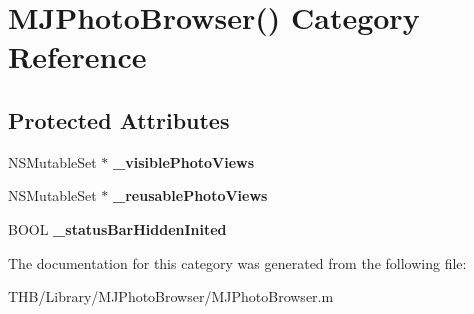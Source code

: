 \hypertarget{category_m_j_photo_browser_07_08}{}\section{M\+J\+Photo\+Browser() Category Reference}
\label{category_m_j_photo_browser_07_08}
\subsection*{Protected Attributes}
\begin{DoxyCompactItemize}
\item 
\mbox{\label{category_m_j_photo_browser_07_08_a8425b142ebed04cab2353333a4bea682}} 
N\+S\+Mutable\+Set $\ast$ {\bfseries \+\_\+visible\+Photo\+Views}
\item 
\mbox{\label{category_m_j_photo_browser_07_08_a3008ca95a1ca4ed5133c5185800deae0}} 
N\+S\+Mutable\+Set $\ast$ {\bfseries \+\_\+reusable\+Photo\+Views}
\item 
\mbox{\label{category_m_j_photo_browser_07_08_a0463ac3319f8b67628866a2a19794668}} 
B\+O\+OL {\bfseries \+\_\+status\+Bar\+Hidden\+Inited}
\end{DoxyCompactItemize}


The documentation for this category was generated from the following file\+:\begin{DoxyCompactItemize}
\item 
T\+H\+B/\+Library/\+M\+J\+Photo\+Browser/M\+J\+Photo\+Browser.\+m\end{DoxyCompactItemize}
